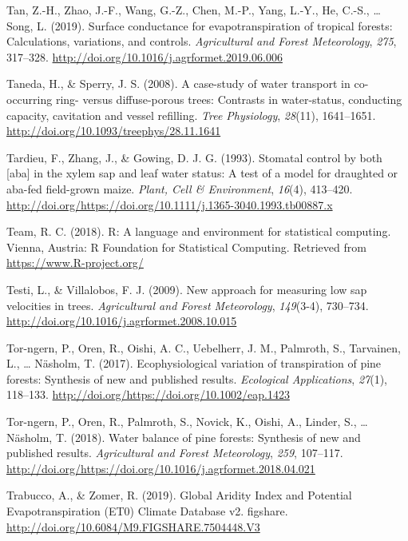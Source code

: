 \documentclass[11pt,twoside]{reedthesis}
\begin{document}
\hypertarget{ref-tan_surface_2019}{}
Tan, Z.-H., Zhao, J.-F., Wang, G.-Z., Chen, M.-P., Yang, L.-Y., He,
C.-S., \ldots{} Song, L. (2019). Surface conductance for
evapotranspiration of tropical forests: Calculations, variations, and
controls. \emph{Agricultural and Forest Meteorology}, \emph{275},
317--328. \url{http://doi.org/10.1016/j.agrformet.2019.06.006}

\hypertarget{ref-Taneda2008}{}
Taneda, H., \& Sperry, J. S. (2008). A case-study of water transport in
co-occurring ring- versus diffuse-porous trees: Contrasts in
water-status, conducting capacity, cavitation and vessel refilling.
\emph{Tree Physiology}, \emph{28}(11), 1641--1651.
\url{http://doi.org/10.1093/treephys/28.11.1641}

\hypertarget{ref-Tardieu1993}{}
Tardieu, F., Zhang, J., \& Gowing, D. J. G. (1993). Stomatal control by
both {[}aba{]} in the xylem sap and leaf water status: A test of a model
for draughted or aba-fed field-grown maize. \emph{Plant, Cell \&
Environment}, \emph{16}(4), 413--420.
\url{http://doi.org/https://doi.org/10.1111/j.1365-3040.1993.tb00887.x}

\hypertarget{ref-r_core_team_r_2018}{}
Team, R. C. (2018). R: A language and environment for statistical
computing. Vienna, Austria: R Foundation for Statistical Computing.
Retrieved from \url{https://www.R-project.org/}

\hypertarget{ref-Testi2009}{}
Testi, L., \& Villalobos, F. J. (2009). New approach for measuring low
sap velocities in trees. \emph{Agricultural and Forest Meteorology},
\emph{149}(3-4), 730--734.
\url{http://doi.org/10.1016/j.agrformet.2008.10.015}

\hypertarget{ref-Tor-ngern2017}{}
Tor-ngern, P., Oren, R., Oishi, A. C., Uebelherr, J. M., Palmroth, S.,
Tarvainen, L., \ldots{} Näsholm, T. (2017). Ecophysiological variation
of transpiration of pine forests: Synthesis of new and published
results. \emph{Ecological Applications}, \emph{27}(1), 118--133.
\url{http://doi.org/https://doi.org/10.1002/eap.1423}

\hypertarget{ref-Torngern2018}{}
Tor-ngern, P., Oren, R., Palmroth, S., Novick, K., Oishi, A., Linder,
S., \ldots{} Näsholm, T. (2018). Water balance of pine forests:
Synthesis of new and published results. \emph{Agricultural and Forest
Meteorology}, \emph{259}, 107--117.
\url{http://doi.org/https://doi.org/10.1016/j.agrformet.2018.04.021}

\hypertarget{ref-trabucco_global_2019}{}
Trabucco, A., \& Zomer, R. (2019). Global Aridity Index and Potential
Evapotranspiration (ET0) Climate Database v2. figshare.
\url{http://doi.org/10.6084/M9.FIGSHARE.7504448.V3}
\end{document}
